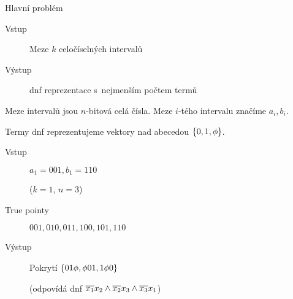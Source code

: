 \documentclass{beamer}
\theoremstyle{remark}
\begin{document}
\begin{frame}
\titlepage
\end{frame}



\begin{frame}{Hlavní problém}

\begin{problem}
\begin{description}
\item[Vstup]
Meze $k$ celočíselných intervalů

\item[Výstup]
\acrshort{dnf} reprezentace s~nejmenším počtem termů
\end{description}
\end{problem}

Meze intervalů jsou $n$-bitová celá čísla.
Meze $i$-tého intervalu značíme $a_i, b_i$.

Termy \acrshort{dnf} reprezentujeme vektory nad abecedou $\{0, 1, \phi\}$.

\begin{example}
\begin{description}
\item[Vstup] $a_1 = 001, b_1 = 110$

($k=1$, $n=3$)


\item[True pointy]
$001, 010, 011, 100, 101, 110$

\item[Výstup]
Pokrytí $\{01 \phi, \phi 01, 1 \phi 0\}$

(odpovídá \acrshort{dnf}
$\overline{x_1} x_2
\wedge
\overline{x_2} x_3
\wedge \overline{x_3} x_1$)
\end{description}
\end{example}

\end{frame}
\end{document}
